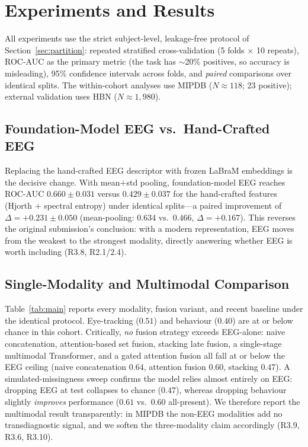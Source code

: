 \section{Experiments and Results}
\label{results}
All experiments use the strict subject-level, leakage-free protocol of
Section~\ref{sec:partition}: repeated stratified cross-validation (5 folds
$\times$ 10 repeats), ROC-AUC as the primary metric (the task has $\sim$20\%
positives, so accuracy is misleading), 95\% confidence intervals across folds, and
\emph{paired} comparisons over identical splits. The within-cohort analyses use
MIPDB ($N \approx 118$; 23 positive); external validation uses HBN
($N \approx 1{,}980$).

\subsection{Foundation-Model EEG vs.\ Hand-Crafted EEG}
Replacing the hand-crafted EEG descriptor with frozen LaBraM embeddings is the
decisive change. With mean$+$std pooling, foundation-model EEG reaches ROC-AUC
$0.660 \pm 0.031$ versus $0.429 \pm 0.037$ for the hand-crafted features (Hjorth $+$
spectral entropy) under identical splits---a paired improvement of
$\Delta = +0.231 \pm 0.050$ (mean-pooling: $0.634$ vs.\ $0.466$, $\Delta = +0.167$).
This reverses the original submission's conclusion: with a modern representation,
EEG moves from the weakest to the strongest modality, directly answering whether EEG
is worth including (R3.8, R2.1/2.4).

\subsection{Single-Modality and Multimodal Comparison}
Table~\ref{tab:main} reports every modality, fusion variant, and recent baseline
under the identical protocol. Eye-tracking ($0.51$) and behaviour ($0.40$) are at or
below chance in this cohort. Critically, \emph{no} fusion strategy exceeds
EEG-alone: naive concatenation, attention-based set fusion, stacking late fusion, a
single-stage multimodal Transformer, and a gated attention fusion all fall at or
below the EEG ceiling (naive concatenation $0.64$, attention fusion $0.60$, stacking
$0.47$). A simulated-missingness sweep confirms the model relies almost entirely on
EEG: dropping EEG at test collapses to chance ($0.47$), whereas dropping behaviour
slightly \emph{improves} performance ($0.61$ vs.\ $0.60$ all-present). We therefore
report the multimodal result
transparently: in MIPDB the non-EEG modalities add no transdiagnostic signal, and we
soften the three-modality claim accordingly (R3.9, R3.6, R3.10).

